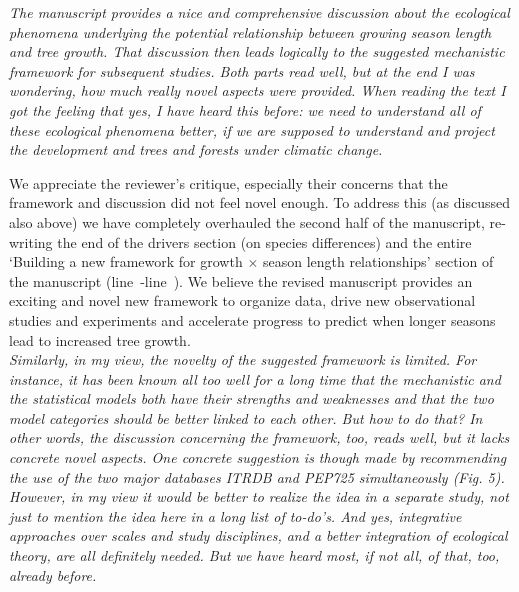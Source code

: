 \documentclass[11pt]{article}
\newcommand{\lr}[1]{line~\lineref{#1}}
\begin{document}
\emph{The manuscript provides a nice and comprehensive discussion about the ecological phenomena underlying the potential relationship between growing season length and tree growth. That discussion then leads logically to the suggested mechanistic framework for subsequent studies. Both parts read well, but at the end I was wondering, how much really novel aspects were provided. When reading the text I got the feeling that yes, I have heard this before: we need to understand all of these ecological phenomena better, if we are supposed to understand and project the development and trees and forests under climatic change.}

We appreciate the reviewer's critique, especially their concerns that the framework and discussion did not feel novel enough. To address this (as discussed also above) we have completely overhauled the second half of the manuscript, re-writing the end of the drivers section (on species differences) and the entire  `Building a new framework for growth $\times$ season length relationships' section of the manuscript (\lr{startframework}-\lr{R3complaint1E}). We believe the revised manuscript provides an exciting and novel new framework to organize data, drive new observational studies and experiments and accelerate progress to predict when longer seasons lead to increased tree growth.\\

\emph{Similarly, in my view, the novelty of the suggested framework is limited. For instance, it has been known all too well for a long time that the mechanistic and the statistical models both have their strengths and weaknesses and that the two model categories should be better linked to each other. But how to do that? In other words, the discussion concerning the framework, too, reads well, but it lacks concrete novel aspects. One concrete suggestion is though made by recommending the use of the two major databases ITRDB and PEP725 simultaneously (Fig. 5). However, in my view it would be better to realize the idea in a separate study, not just to mention the idea here in a long list of to-do’s. And yes, integrative approaches over scales and study disciplines, and a better integration of ecological theory, are all definitely needed. But we have heard most, if not all, of that, too, already before.}
\end{document}
